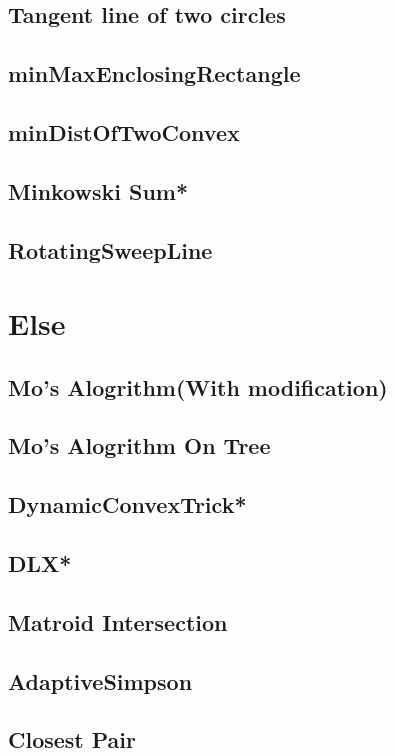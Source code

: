 \subsection{Tangent line of two circles}

\subsection{minMaxEnclosingRectangle}

\subsection{minDistOfTwoConvex}

\subsection{Minkowski Sum*} %

\subsection{RotatingSweepLine}


\section{Else}
\subsection{Mo's Alogrithm(With modification)}

\subsection{Mo's Alogrithm On Tree}

\subsection{DynamicConvexTrick*} %

\subsection{DLX*} %

\subsection{Matroid Intersection}

\subsection{AdaptiveSimpson}

\subsection{Closest Pair}

